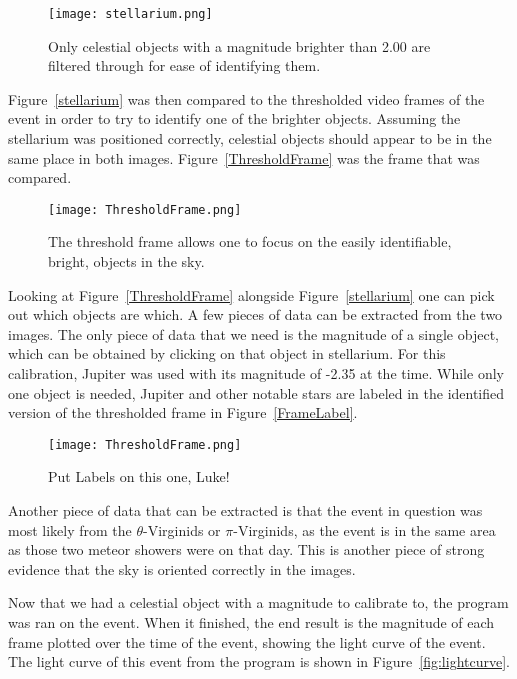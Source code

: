 \begin{figure}[ht!]
	\centering
	\texttt{[image: stellarium.png]}
	\caption{Only celestial objects with a magnitude brighter than 2.00 are filtered through for ease of identifying them.}
	\label{fig:stellarium}
\end{figure}

Figure~\ref{stellarium} was then compared to the thresholded video frames of the event in order to try to identify one of the brighter objects. Assuming the stellarium was positioned correctly, celestial objects should appear to be in the same place in both images. Figure~\ref{ThresholdFrame} was the frame that was compared. 

\begin{figure}[ht!]
	\centering
	\texttt{[image: ThresholdFrame.png]}
	\caption{The threshold frame allows one to focus on the easily identifiable, bright, objects in the sky.}
	\label{fig:ThresholdFrame}
\end{figure}

Looking at Figure~\ref{ThresholdFrame} alongside Figure~\ref{stellarium} one can pick out which objects are which. A few pieces of data can be extracted from the two images. The only piece of data that we need is the magnitude of a single object, which can be obtained by clicking on that object in stellarium. For this calibration, Jupiter was used with its magnitude of -2.35 at the time. While only one object is needed, Jupiter and other notable stars are labeled in the identified version of the thresholded frame in Figure~\ref{FrameLabel}.

\begin{figure}[ht!]
	\centering
	\texttt{[image: ThresholdFrame.png]}
	\caption{Put Labels on this one, Luke!}
	\label{fig:FrameLabel}
\end{figure}

Another piece of data that can be extracted is that the event in question was most likely from the $\theta$-Virginids or $\pi$-Virginids, as the event is in the same area as those two meteor showers were on that day. This is another piece of strong evidence that the sky is oriented correctly in the images.

Now that we had a celestial object with a magnitude to calibrate to, the program was ran on the event. When it finished, the end result is the magnitude of each frame plotted over the time of the event, showing the light curve of the event. The light curve of this event from the program is shown in Figure~\ref{fig:lightcurve}. 

